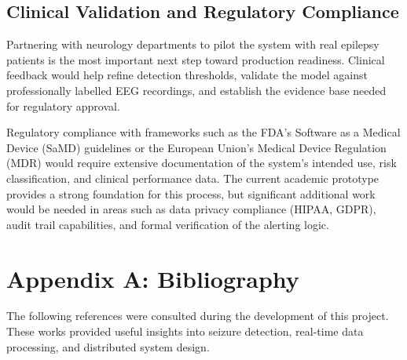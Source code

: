 \documentclass[12pt, a4paper, oneside]{report}
\begin{document}
\section{Clinical Validation and Regulatory Compliance}

Partnering with neurology departments to pilot the system with real epilepsy patients is the most important next step toward production readiness. Clinical feedback would help refine detection thresholds, validate the model against professionally labelled EEG recordings, and establish the evidence base needed for regulatory approval.

Regulatory compliance with frameworks such as the FDA's Software as a Medical Device (SaMD) guidelines or the European Union's Medical Device Regulation (MDR) would require extensive documentation of the system's intended use, risk classification, and clinical performance data. The current academic prototype provides a strong foundation for this process, but significant additional work would be needed in areas such as data privacy compliance (HIPAA, GDPR), audit trail capabilities, and formal verification of the alerting logic.





\appendix

\chapter*{Appendix A: Bibliography}

The following references were consulted during the development of this project. These works provided useful insights into seizure detection, real-time data processing, and distributed system design.
\end{document}

